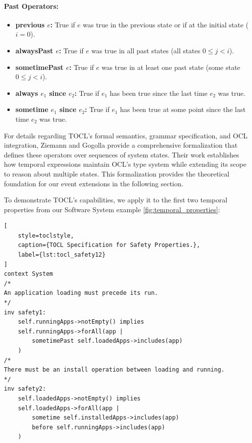 \paragraph{Past Operators:} 
\begin{itemize} 
    \item \textbf{previous $e$:} True if $e$ was true in the previous state or if at the initial state ($i = 0$). 
    \item \textbf{alwaysPast $e$:} True if $e$ was true in all past states (all states $0 \leq j < i$). 
    \item \textbf{sometimePast $e$:} True if $e$ was true in at least one past state (some state $0 \leq j < i$). 
    \item \textbf{always $e_1$ since $e_2$:} True if $e_1$ has been true since the last time $e_2$ was true. 
    \item \textbf{sometime $e_1$ since $e_2$:} True if $e_1$ has been true at some point since the last time $e_2$ was true. 
\end{itemize}

For details regarding TOCL's formal semantics, grammar specification, and OCL integration, Ziemann and Gogolla \cite{TOCL} provide a comprehensive formalization that defines these operators over sequences of system states. Their work establishes how temporal expressions maintain OCL's type system while extending its scope to reason about multiple states. This formalization provides the theoretical foundation for our event extensions in the following section.

To demonstrate TOCL's capabilities, we apply it to the first two temporal properties 
from our Software System example \ref{fig:temporal_properties}:

\begin{lstlisting}[
    style=toclstyle, 
    caption={TOCL Specification for Safety Properties.}, 
    label={lst:tocl_safety12}
]
context System 
/*
An application loading must precede its run.
*/
inv safety1: 
    self.runningApps->notEmpty() implies 
    self.runningApps->forAll(app | 
        sometimePast self.loadedApps->includes(app)
    )
/*
There must be an install operation between loading and running.
*/
inv safety2: 
    self.loadedApps->notEmpty() implies 
    self.loadedApps->forAll(app | 
        sometime self.installedApps->includes(app) 
        before self.runningApps->includes(app)
    )
\end{lstlisting}

